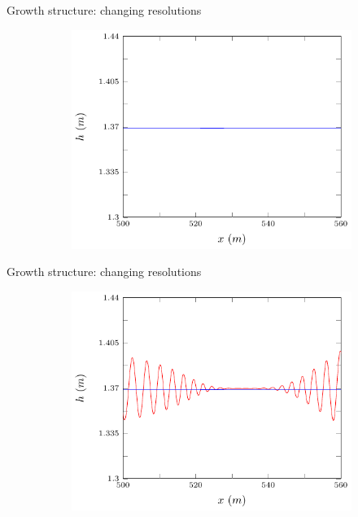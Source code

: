 \documentclass[pdf]{beamer}
\begin{document}
\begin{frame}{Growth structure: changing resolutions}
	\begin{figure}
		\begin{subfigure}{0.75\textwidth}
			\includegraphics[width=\textwidth]{../Pics/dx0/4/2-figure0.pdf}
		\end{subfigure}
	\end{figure}
\end{frame}

\begin{frame}{Growth structure: changing resolutions}
	\begin{figure}
		\begin{subfigure}{0.75\textwidth}
			\includegraphics[width=\textwidth]{../Pics/dx0/46/2-figure0.pdf}
		\end{subfigure}
	\end{figure}
\end{frame}
\end{document}
